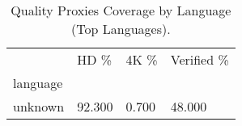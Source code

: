 \begin{table}[htbp]
\centering
\caption{Quality Proxies Coverage by Language (Top Languages).}
\label{tab:eda_quality_by_language}
\begin{tabular}{llll}
\toprule
 & HD \% & 4K \% & Verified \% \\
language &  &  &  \\
\midrule
unknown & 92.300 & 0.700 & 48.000 \\
\bottomrule
\end{tabular}

\end{table}